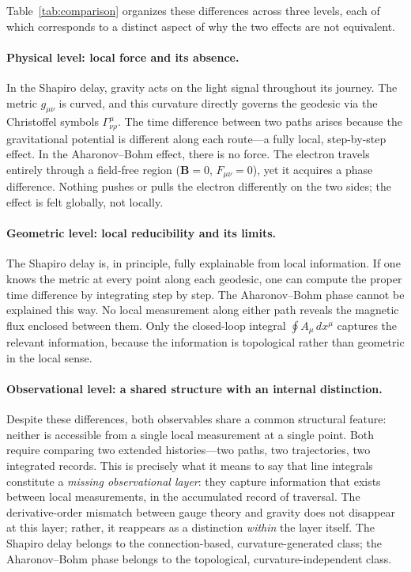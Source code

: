 \documentclass[12pt,letterpaper]{article}
\begin{document}
Table~\ref{tab:comparison} organizes these differences across three levels, each of which corresponds to a distinct aspect of why the two effects are not equivalent.

\paragraph{Physical level: local force and its absence.}
In the Shapiro delay, gravity acts on the light signal throughout its journey. The metric $g_{\mu\nu}$ is curved, and this curvature directly governs the geodesic via the Christoffel symbols $\Gamma^\mu_{\nu\rho}$. The time difference between two paths arises because the gravitational potential is different along each route---a fully local, step-by-step effect. In the Aharonov--Bohm effect, there is no force. The electron travels entirely through a field-free region ($\mathbf{B}=0$, $F_{\mu\nu}=0$), yet it acquires a phase difference. Nothing pushes or pulls the electron differently on the two sides; the effect is felt globally, not locally.

\paragraph{Geometric level: local reducibility and its limits.}
The Shapiro delay is, in principle, fully explainable from local information. If one knows the metric at every point along each geodesic, one can compute the proper time difference by integrating step by step. The Aharonov--Bohm phase cannot be explained this way. No local measurement along either path reveals the magnetic flux enclosed between them. Only the closed-loop integral $\oint A_\mu\,dx^\mu$ captures the relevant information, because the information is topological rather than geometric in the local sense.

\paragraph{Observational level: a shared structure with an internal distinction.}
Despite these differences, both observables share a common structural feature: neither is accessible from a single local measurement at a single point. Both require comparing two extended histories---two paths, two trajectories, two integrated records. This is precisely what it means to say that line integrals constitute a \emph{missing observational layer}: they capture information that exists between local measurements, in the accumulated record of traversal. The derivative-order mismatch between gauge theory and gravity does not disappear at this layer; rather, it reappears as a distinction \emph{within} the layer itself. The Shapiro delay belongs to the connection-based, curvature-generated class; the Aharonov--Bohm phase belongs to the topological, curvature-independent class.
\end{document}
